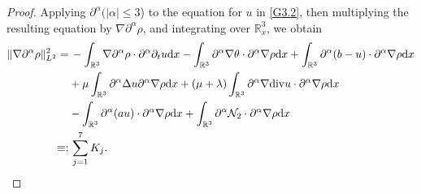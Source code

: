 \documentclass[reqno,11pt]{amsart}
\theoremstyle{plain}
\numberwithin{equation}{section}
\begin{document}
\begin{proof}
Applying $\partial^\alpha (|\alpha| \leq 3$) to the equation for $u$ in \eqref{G3.2}, then multiplying the resulting equation by $\nabla\partial^\alpha\rho$, and integrating over $\mathbb{R}^3_x$, we obtain 
\begin{align}\label{G3.26}
 \|\nabla \partial^\alpha \rho \|_{L^2}^2= &\,-\int_{\mathbb{R}^3} \nabla \partial^\alpha \rho \cdot\partial^\alpha \partial_t u \mathrm{d} x-\int_{\mathbb{R}^3}\partial^\alpha\nabla\theta\cdot\partial^\alpha\nabla\rho{\rm d}x+\int_{\mathbb{R}^3}\partial^\alpha(b-u)\cdot\partial^\alpha\nabla\rho {\rm d}x\nonumber\\
 &+\mu\int_{\mathbb{R}^3}\partial^\alpha\Delta u\partial^\alpha\nabla\rho {\rm d}x+(\mu+\lambda)\int_{\mathbb{R}^3}\partial^\alpha\nabla{\rm div
 } u\cdot
\partial^\alpha\nabla\rho {\rm d}x\nonumber\\
&-\int_{\mathbb{R}^3}\partial^\alpha(a
 u)\cdot\partial^\alpha\nabla\rho {\rm d}x+\int_{\mathbb{R}^3}\partial^\alpha\mathcal{N}_2\cdot\partial^\alpha\nabla\rho {\rm d}x\nonumber\\
\equiv:&\,\sum_{j={1}}^7 K_j. 
\end{align}


\end{proof}
\end{document}
